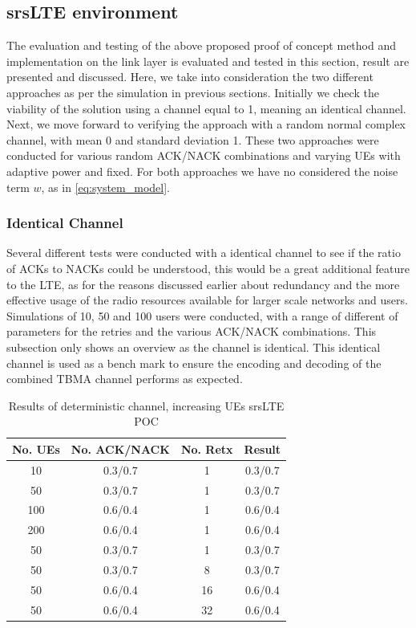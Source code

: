 \documentclass{article}
\begin{document}
\subsection{srsLTE environment}
The evaluation and testing of the above proposed proof of concept method and implementation on the link layer is evaluated and tested in this section, result are presented and discussed. Here, we take into consideration the two different approaches as per the simulation in previous sections. Initially we check the viability of the solution using a channel equal to 1, meaning an identical channel. Next, we move forward to verifying the approach with a random normal complex channel, with mean 0 and standard deviation 1. These two approaches were conducted for various random ACK/NACK combinations and varying UEs with adaptive power and fixed. For both approaches we have no considered the noise term $w$, as in \cref{eq:system_model}.

\subsubsection{Identical Channel}
Several different tests were conducted with a identical channel to see if the ratio of ACKs to NACKs could be understood, this would be a great additional feature to the LTE, as for the reasons discussed earlier about redundancy and the more effective usage of the radio resources available for larger scale networks and users. Simulations of 10, 50 and 100 users were conducted, with a range of different of parameters for the retries and the various ACK/NACK combinations. This subsection only shows an overview as the channel is identical. This identical channel is used as a bench mark to ensure the encoding and decoding of the combined TBMA channel performs as expected. 

\begin{table}[H]
    \centering
 \begin{tabular}{||c c c c||} 
 \hline
 No. UEs & No. ACK/NACK & No. Retx & Result \\ [0.5ex] 
 \hline\hline
 10 & 0.3/0.7 & 1 &  0.3/0.7 \\ 
 \hline
 50 & 0.3/0.7 & 1 & 0.3/0.7 \\
 \hline
 100 & 0.6/0.4 & 1 & 0.6/0.4 \\
 \hline
 200 & 0.6/0.4 & 1 & 0.6/0.4 \\
 \hline
 50 & 0.3/0.7 & 1 &  0.3/0.7 \\ 
 \hline
 50 & 0.3/0.7 & 8 & 0.3/0.7 \\
 \hline
 50 & 0.6/0.4 & 16 & 0.6/0.4 \\
 \hline
 50 & 0.6/0.4 & 32 & 0.6/0.4 \\ [1ex] 
 \hline
\end{tabular}
    \caption{Results of deterministic channel, increasing UEs srsLTE POC}
    \label{tab:identical_ue_srs}
\end{table}
\end{document}
